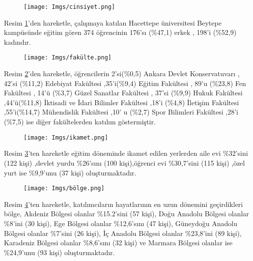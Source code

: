 \documentclass[turkish]{article}
\begin{document}
    \begin{figure}[ht]
    \centering
    \texttt{[image: Imgs/cinsiyet.png]}
    \caption{}
    \label{cinsiyet}
\end{figure}  
Resim \ref{cinsiyet}'den hareketle, çalışmaya katılan Hacettepe üniversitesi Beytepe kampüsünde eğitim gören 374 öğrencinin 176’sı (\%47,1) erkek , 198’i (\%52,9) kadındır.
\\

   \begin{figure}[ht]
    \centering
    \texttt{[image: Imgs/fakülte.png]}
    \caption{}
    \label{fakülte}
\end{figure}     
Resim \ref{fakülte}'den hareketle, öğrencilerin  2’si(\%0,5) Ankara Devlet Konservatuvarı , 42’si (\%11,2) Edebiyat Fakültesi ,35’i(\%9,4) Eğitim Fakültesi , 89’u (\%23,8) Fen Fakültesi , 14’ü (\%3,7) Güzel Sanatlar Fakültesi , 37’si (\%9,9) Hukuk Fakültesi ,44’ü(\%11,8) İktisadi ve İdari Bilimler Fakültesi ,18’i (\%4,8) İletişim Fakültesi ,55’i(\%14,7) Mühendislik Fakültesi ,10’ u (\%2,7) Spor Bilimleri Fakültesi ,28’i (\%7,5) ise diğer fakültelerden katılım göstermiştir.
\clearpage
    \begin{figure}[ht]
    \centering
    \texttt{[image: Imgs/ikamet.png]}
    \caption{}
    \label{ikamet}
\end{figure}   
Resim \ref{ikamet}'ten hareketle eğitim döneminde ikamet edilen yerlerden aile evi \%32’sini (122 kişi) ,devlet yurdu \%26’sını (100 kişi),öğrenci evi \%30,7’sini (115 kişi) ,özel yurt ise \%9,9’unu (37 kişi) oluşturmaktadır.

      \begin{figure}[ht]
    \centering
    \texttt{[image: Imgs/bölge.png]}
    \caption{}
    \label{bölge}
\end{figure}   
Resim \ref{bölge}'ten hareketle, katılımcıların hayatlarının en uzun dönemini geçirdikleri bölge, Akdeniz Bölgesi olanlar \%15.2’sini (57 kişi), Doğu Anadolu Bölgesi olanlar \%8’ini (30 kişi), Ege Bölgesi olanlar \%12,6’sını (47 kişi), Güneydoğu Anadolu Bölgesi olanlar \%7’sini (26 kişi), İç Anadolu Bölgesi olanlar \%23,8’ini (89 kişi), Karadeniz Bölgesi olanlar \%8,6’sını (32 kişi) ve Marmara Bölgesi olanlar ise \%24,9’unu (93 kişi) oluşturmaktadır.
\end{document}
